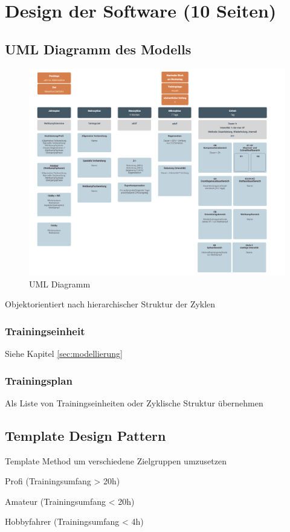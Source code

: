 \chapter{Design der Software (10 Seiten)}
\label{sec:design}

\section{UML Diagramm des Modells}
\label{sec:design:UML}
\begin{figure}[htb]
	\includegraphics[width=\textwidth]{gfx/uml.png}
	\caption{UML Diagramm}
	\label{fig:system:example1}
\end{figure}
Objektorientiert nach hierarchischer Struktur der Zyklen
\subsection{Trainingseinheit}
    Siehe Kapitel \ref{sec:modellierung}
\subsection{Trainingsplan}
    Als Liste von Trainingseinheiten oder Zyklische Struktur übernehmen
 
\section{Template Design Pattern}
\label{sec:design:template}
Template Method um verschiedene Zielgruppen umzusetzen

Profi (Trainingsumfang > 20h)

Amateur (Trainingsumfang < 20h)

Hobbyfahrer (Trainingsumfang < 4h)
